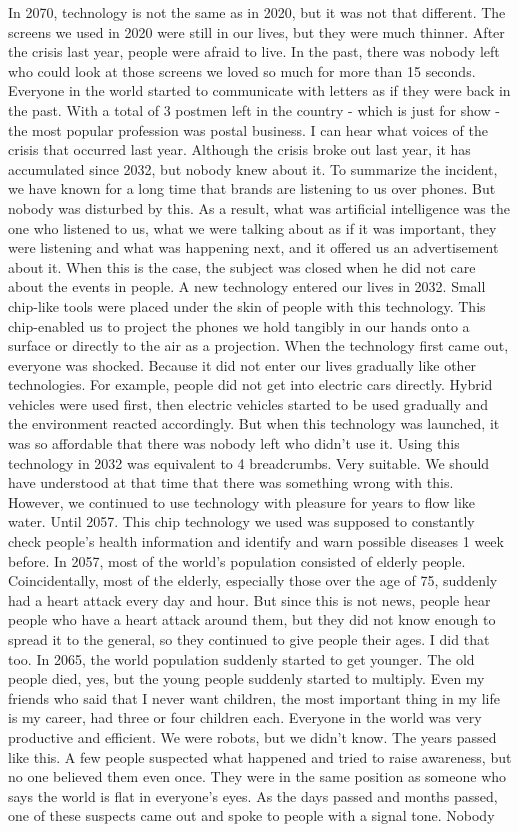 \documentclass[]{book}
\begin{document}
In 2070, technology is not the same as in 2020, but it was not that different. The screens we used in 2020 were still in our lives, but they were much thinner. After the crisis last year, people were afraid to live. In the past, there was nobody left who could look at those screens we loved so much for more than 15 seconds. Everyone in the world started to communicate with letters as if they were back in the past. With a total of 3 postmen left in the country - which is just for show - the most popular profession was postal business. I can hear what voices of the crisis that occurred last year. Although the crisis broke out last year, it has accumulated since 2032, but nobody knew about it. To summarize the incident, we have known for a long time that brands are listening to us over phones. But nobody was disturbed by this. As a result, what was artificial intelligence was the one who listened to us, what we were talking about as if it was important, they were listening and what was happening next, and it offered us an advertisement about it. When this is the case, the subject was closed when he did not care about the events in people. A new technology entered our lives in 2032. Small chip-like tools were placed under the skin of people with this technology. This chip-enabled us to project the phones we hold tangibly in our hands onto a surface or directly to the air as a projection. When the technology first came out, everyone was shocked. Because it did not enter our lives gradually like other technologies. For example, people did not get into electric cars directly. Hybrid vehicles were used first, then electric vehicles started to be used gradually and the environment reacted accordingly. But when this technology was launched, it was so affordable that there was nobody left who didn't use it. Using this technology in 2032 was equivalent to 4 breadcrumbs. Very suitable. We should have understood at that time that there was something wrong with this. However, we continued to use technology with pleasure for years to flow like water. Until 2057. This chip technology we used was supposed to constantly check people's health information and identify and warn possible diseases 1 week before. In 2057, most of the world's population consisted of elderly people. Coincidentally, most of the elderly, especially those over the age of 75, suddenly had a heart attack every day and hour. But since this is not news, people hear people who have a heart attack around them, but they did not know enough to spread it to the general, so they continued to give people their ages. I did that too. In 2065, the world population suddenly started to get younger. The old people died, yes, but the young people suddenly started to multiply. Even my friends who said that I never want children, the most important thing in my life is my career, had three or four children each. Everyone in the world was very productive and efficient. We were robots, but we didn't know. The years passed like this. A few people suspected what happened and tried to raise awareness, but no one believed them even once. They were in the same position as someone who says the world is flat in everyone's eyes. As the days passed and months passed, one of these suspects came out and spoke to people with a signal tone. Nobody 
\end{document}
